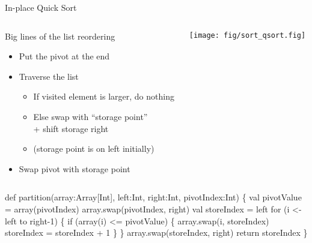 \begin{frame}[fragile]{In-place Quick Sort}
  \begin{columns}
    \begin{column}{.6\linewidth}
      \begin{block}{Big lines of the list reordering}
        \begin{itemize}
        \item Put the pivot at the end
        \item Traverse the list
          \begin{itemize}
          \item If visited element is larger, do nothing
          \item Else swap with ``storage point'' \\
            + shift storage right
          \item[] (storage point is on left initially)
          \end{itemize}
        \item Swap pivot with storage point
        \end{itemize}
      \end{block}      
    \end{column}
    \begin{column}{.4\linewidth}
      \texttt{[image: fig/sort\_qsort.fig]}      
    \end{column}
  \end{columns}

  \begin{center}
    \begin{boitecode}{}
def partition(array:Array[Int], left:Int, right:Int, pivotIndex:Int) \{
  val pivotValue = array(pivotIndex)
  array.swap(pivotIndex, right) 
  val storeIndex = left
  for (i <- left to right-1) \{
    if (array(i) <= pivotValue) \{
      array.swap(i, storeIndex)
      storeIndex = storeIndex + 1
  \} \}
  array.swap(storeIndex, right) 
  return storeIndex
\}
  \end{boitecode}
 \end{center}
\end{frame}
